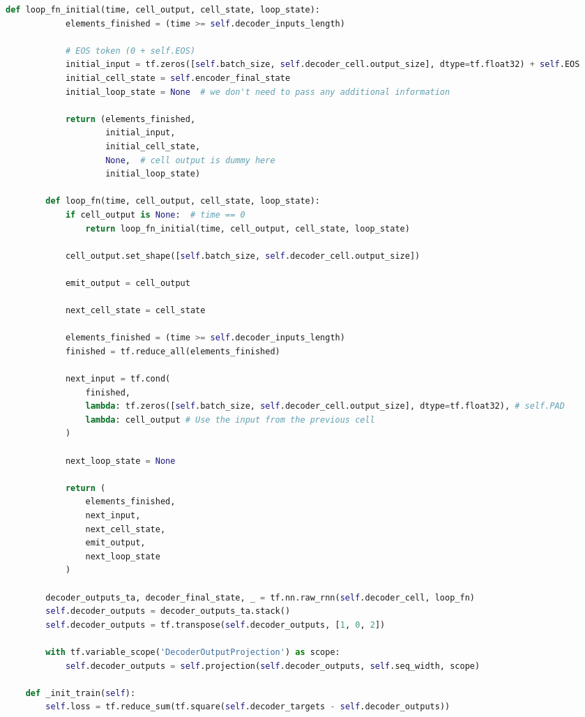 \begin{landscape}
\begin{multicols}{2}
\begin{lstlisting}[language=Python]
        def loop_fn_initial(time, cell_output, cell_state, loop_state):
            elements_finished = (time >= self.decoder_inputs_length)

            # EOS token (0 + self.EOS)
            initial_input = tf.zeros([self.batch_size, self.decoder_cell.output_size], dtype=tf.float32) + self.EOS
            initial_cell_state = self.encoder_final_state
            initial_loop_state = None  # we don't need to pass any additional information

            return (elements_finished,
                    initial_input,
                    initial_cell_state,
                    None,  # cell output is dummy here
                    initial_loop_state)

        def loop_fn(time, cell_output, cell_state, loop_state):
            if cell_output is None:  # time == 0
                return loop_fn_initial(time, cell_output, cell_state, loop_state)

            cell_output.set_shape([self.batch_size, self.decoder_cell.output_size])

            emit_output = cell_output

            next_cell_state = cell_state

            elements_finished = (time >= self.decoder_inputs_length)
            finished = tf.reduce_all(elements_finished)

            next_input = tf.cond(
                finished,
                lambda: tf.zeros([self.batch_size, self.decoder_cell.output_size], dtype=tf.float32), # self.PAD
                lambda: cell_output # Use the input from the previous cell
            )

            next_loop_state = None

            return (
                elements_finished,
                next_input,
                next_cell_state,
                emit_output,
                next_loop_state
            )

        decoder_outputs_ta, decoder_final_state, _ = tf.nn.raw_rnn(self.decoder_cell, loop_fn)
        self.decoder_outputs = decoder_outputs_ta.stack()
        self.decoder_outputs = tf.transpose(self.decoder_outputs, [1, 0, 2])

        with tf.variable_scope('DecoderOutputProjection') as scope:
            self.decoder_outputs = self.projection(self.decoder_outputs, self.seq_width, scope)

    def _init_train(self):
        self.loss = tf.reduce_sum(tf.square(self.decoder_targets - self.decoder_outputs))


\end{lstlisting}
\end{multicols}
\end{landscape}
